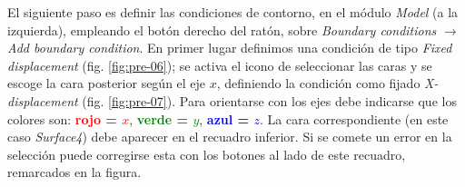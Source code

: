 El siguiente paso es definir las condiciones de contorno, en el módulo \emph{Model} (a la izquierda), empleando el botón derecho del ratón, sobre \emph{Boundary conditions} $\to$  \emph{Add boundary condition}.
En primer lugar definimos una condición de tipo \emph{Fixed displacement} (fig. \ref{fig:pre-06}); se activa el icono de seleccionar las caras y se escoge la cara posterior según el eje $x$, definiendo la condición como fijado \emph{X-displacement} (fig. \ref{fig:pre-07}).
Para orientarse con los ejes debe indicarse que los colores son: \textcolor{red}{\bf rojo = $x$}, \textcolor{green}{\bf verde = $y$}, \textcolor{blue}{\bf azul = $z$}.
La cara correspondiente (en este caso \emph{Surface4}) debe aparecer en el recuadro inferior.
Si se comete un error en la selección puede corregirse esta con los botones al lado de este recuadro, remarcados en la figura.
